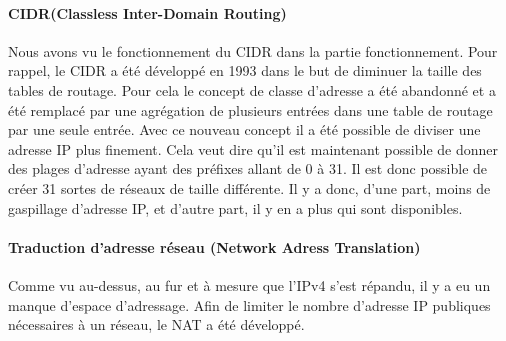 \paragraph{CIDR(Classless Inter-Domain Routing)}
Nous avons vu le fonctionnement du CIDR dans la partie fonctionnement. Pour rappel, le
CIDR a été développé en 1993 dans le but de diminuer la taille des tables de routage. Pour 
cela le concept de classe d'adresse a été abandonné et a été remplacé par une agrégation de 
plusieurs entrées dans une table de routage par une seule entrée.
Avec ce nouveau concept il a été possible de diviser une adresse IP plus finement. Cela veut 
dire qu'il est maintenant possible de donner des plages d'adresse ayant des préfixes allant 
de 0 à 31. Il est donc possible de créer 31 sortes de réseaux de taille différente. Il y a 
donc, d'une part, moins de gaspillage d'adresse IP, et d'autre part, il y en a plus qui sont disponibles.

\paragraph{Traduction d'adresse réseau (Network Adress Translation)}
\label{sec:nat}
Comme vu au-dessus, au fur et à mesure que l'IPv4 s'est répandu, il y a eu un manque
d'espace d'adressage. Afin de limiter le nombre d'adresse IP publiques nécessaires
à un réseau, le NAT a été développé.

